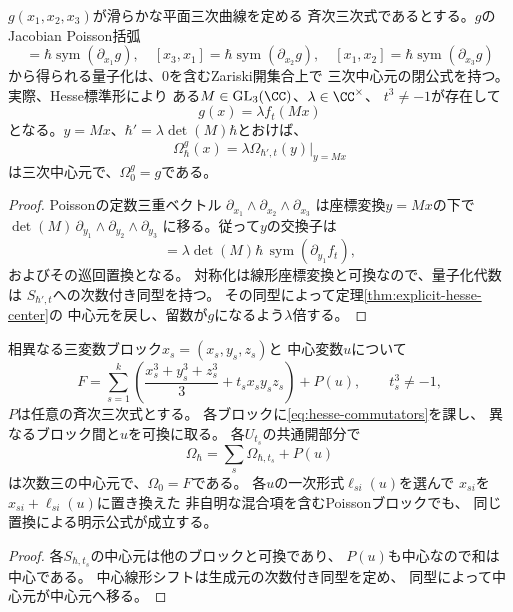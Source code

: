 \begin{corollary}[任意の滑らかな三変数三次式]
\label{cor:arbitrary-smooth-ternary-cubic}
$g(x_1,x_2,x_3)$が滑らかな平面三次曲線を定める
斉次三次式であるとする。$g$のJacobian Poisson括弧
\begin{equation}
 [x_2,x_3]=\hbar\operatorname{sym}(\partial_{x_1}g),
 \quad [x_3,x_1]=\hbar\operatorname{sym}(\partial_{x_2}g),
 \quad [x_1,x_2]=\hbar\operatorname{sym}(\partial_{x_3}g)
\end{equation}
から得られる量子化は、$0$を含むZariski開集合上で
三次中心元の閉公式を持つ。
実際、Hesse標準形\cite[Lemma 1]{ArtebaniDolgachev}により
ある$M\in\mathrm{GL}_3(\CC)$、$\lambda\in\CC^\times$、
$t^3\ne-1$が存在して
\begin{equation}
 g(x)=\lambda f_t(Mx)
\end{equation}
となる。$y=Mx$、$\hbar'=\lambda\det(M)\hbar$とおけば、
\begin{equation}
 \boxed{\ \Omega^g_\hbar(x)=
  \lambda\Omega_{\hbar',t}(y)\big|_{y=Mx}\ }
 \label{eq:arbitrary-ternary-central}
\end{equation}
は三次中心元で、$\Omega^g_0=g$である。
\end{corollary}
\begin{proof}
Poissonの定数三重ベクトル
$\partial_{x_1}\wedge\partial_{x_2}\wedge\partial_{x_3}$
は座標変換$y=Mx$の下で
$\det(M)\,
 \partial_{y_1}\wedge\partial_{y_2}\wedge\partial_{y_3}$
に移る。従って$y$の交換子は
\begin{equation}
 [y_2,y_3]
 =\lambda\det(M)\hbar\,
   \operatorname{sym}(\partial_{y_1}f_t),
\end{equation}
およびその巡回置換となる。
対称化は線形座標変換と可換なので、量子化代数は
$S_{\hbar',t}$への次数付き同型を持つ。
その同型によって定理\ref{thm:explicit-hesse-center}の
中心元を戻し、留数が$g$になるよう$\lambda$倍する。
\end{proof}

\begin{corollary}[中心変数と独立ブロックの閉公式]
\label{cor:hesse-block-center}
相異なる三変数ブロック$x_s=(x_s,y_s,z_s)$と
中心変数$u$について
\begin{equation}
 F=\sum_{s=1}^k
 \left(\frac{x_s^3+y_s^3+z_s^3}{3}
       +t_sx_sy_sz_s\right)+P(u),
 \qquad t_s^3\ne-1,
\end{equation}
$P$は任意の斉次三次式とする。
各ブロックに\eqref{eq:hesse-commutators}を課し、
異なるブロック間と$u$を可換に取る。
各$U_{t_s}$の共通開部分で
\begin{equation}
 \Omega_\hbar
   =\sum_s\Omega_{\hbar,t_s}+P(u)
 \label{eq:hesse-multiblock}
\end{equation}
は次数三の中心元で、$\Omega_0=F$である。
各$u$の一次形式$\ell_{si}(u)$を選んで
$x_{si}$を$x_{si}+\ell_{si}(u)$に置き換えた
非自明な混合項を含むPoissonブロックでも、
同じ置換による明示公式が成立する。
\end{corollary}
\begin{proof}
各$S_{\hbar,t_s}$の中心元は他のブロックと可換であり、
$P(u)$も中心なので和は中心である。
中心線形シフトは生成元の次数付き同型を定め、
同型によって中心元が中心元へ移る。
\end{proof}


